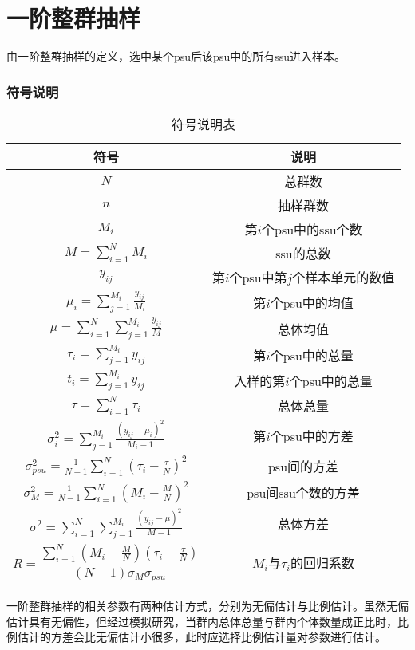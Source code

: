 \section{一阶整群抽样}
由一阶整群抽样的定义，选中某个psu后该psu中的所有ssu进入样本。
\subsubsection{符号说明}
\begin{table}[H]
	\centering
	\setlength{\tabcolsep}{25pt} %
	\renewcommand{\arraystretch}{1.5}
	\begin{tabular}{cc}
		\toprule
		符号    & 说明 \\
		\midrule
		$N$ & 总群数 \\
		$n$ & 抽样群数 \\
		$M_i$ & 第$i$个psu中的ssu个数 \\
		$M=\sum_{i=1}^{N}M_i$ & ssu的总数 \\
		$y_{ij}$ & 第$i$个psu中第$j$个样本单元的数值\\
		$\mu_i=\sum_{j=1}^{M_i}\frac{y_{ij}}{M_i}$ & 第$i$个psu中的均值 \\
		$\mu=\sum_{i=1}^{N}\sum_{j=1}^{M_i}\frac{y_{ij}}{M}$ & 总体均值 \\
		$\tau_i=\sum_{j=1}^{M_i}y_{ij}$ & 第$i$个psu中的总量 \\
		$t_i=\sum_{j=1}^{M_i}y_{ij}$ & 入样的第$i$个psu中的总量 \\
		$\tau=\sum_{i=1}^{N}\tau_i$ & 总体总量 \\
		$\sigma_i^2=\sum_{j=1}^{M_i}\frac{(y_{ij}-\mu_{i})^2}{M_i-1}$ & 第$i$个psu中的方差 \\
		$\sigma_{psu}^2=\frac{1}{N-1}\sum_{i=1}^N\left(\tau_i-\frac{\tau}{N}\right)^2$ & psu间的方差 \\
		$\sigma_M^2=\frac{1}{N-1}\sum_{i=1}^{N}\left(M_i-\frac{M}{N}\right)^2$ & psu间ssu个数的方差 \\
		$\sigma^2=\sum_{i=1}^N\sum_{j=1}^{M_i}\frac{(y_{ij}-\mu)^2}{M-1}$ & 总体方差 \\
		$R=\dfrac{\sum_{i=1}^{N}(M_i-\frac{M}{N})(\tau_i-\frac{\tau}{N})}{(N-1)\sigma_{M}\sigma_{psu}}$ & $M_i$与$\tau_i$的回归系数 \\
		\bottomrule
	\end{tabular}
	\caption{符号说明表}
\end{table}
一阶整群抽样的相关参数有两种估计方式，分别为无偏估计与比例估计。虽然无偏估计具有无偏性，但经过模拟研究，当群内总体总量与群内个体数量成正比时，比例估计的方差会比无偏估计小很多，此时应选择比例估计量对参数进行估计。

